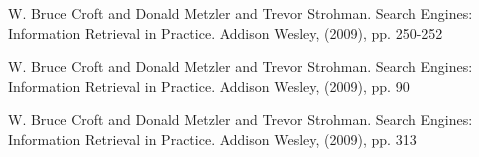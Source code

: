 \documentclass[runningheads]{llncs}
\begin{document}
\begin{thebibliography}{8}

W. Bruce Croft and Donald Metzler and Trevor Strohman. Search Engines: Information Retrieval in Practice. Addison Wesley, (2009), pp. 250-252

W. Bruce Croft and Donald Metzler and Trevor Strohman. Search Engines: Information Retrieval in Practice. Addison Wesley, (2009), pp. 90

W. Bruce Croft and Donald Metzler and Trevor Strohman. Search Engines: Information Retrieval in Practice. Addison Wesley, (2009), pp. 313

\end{thebibliography}

\begin{figure}[h!]
\end{figure}
\end{document}
